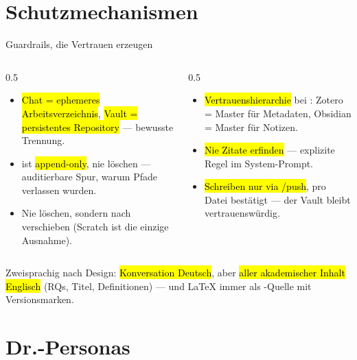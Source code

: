 \documentclass[aspectratio=169,11pt]{beamer}
\begin{document}
\section{Schutzmechanismen}

\begin{frame}{Guardrails, die Vertrauen erzeugen}
  \begin{columns}[T]
    \begin{column}{0.5\textwidth}
      \begin{itemize}
        \item \hl{Chat = ephemeres Arbeitsverzeichnis}, \hl{Vault =
              persistentes Repository} --- bewusste Trennung.
        \item {} ist \hl{append-only}, nie löschen ---
              auditierbare Spur, warum Pfade verlassen wurden.
        \item Nie löschen, sondern nach  verschieben
              (Scratch ist die einzige Ausnahme).
      \end{itemize}
    \end{column}
    \begin{column}{0.5\textwidth}
      \begin{itemize}
        \item \hl{Vertrauenshierarchie} bei : Zotero = Master
              für Metadaten, Obsidian = Master für Notizen.
        \item \hl{Nie Zitate erfinden} --- explizite Regel im System-Prompt.
        \item \hl{Schreiben nur via /push}, pro Datei bestätigt --- der
              Vault bleibt vertrauenswürdig.
      \end{itemize}
    \end{column}
  \end{columns}
  \vfill
  {\footnotesize Zweisprachig nach Design: \hl{Konversation Deutsch}, aber
  \hl{aller akademischer Inhalt Englisch} (RQs, Titel, Definitionen) ---
  und LaTeX immer als -Quelle mit Versionsmarken.}
\end{frame}

\section{Dr.-Personas}
\end{document}

